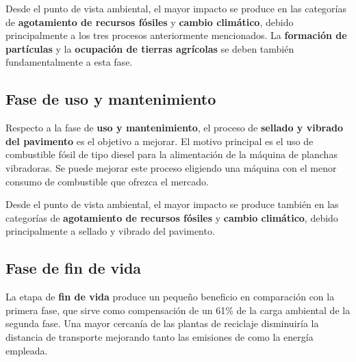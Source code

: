Desde el punto de vista ambiental, el mayor impacto se produce en las categorías de \textbf{agotamiento de recursos fósiles} y \textbf{cambio climático}, debido principalmente a los tres procesos anteriormente mencionados. La \textbf{formación de partículas} y la \textbf{ocupación de tierras agrícolas} se deben también fundamentalmente a esta fase.

\subsection{Fase de uso y mantenimiento}
Respecto a la fase de \textbf{uso y mantenimiento}, el proceso de \textbf{sellado y vibrado del pavimento} es el objetivo a mejorar. El motivo principal es el uso de combustible fósil de tipo diesel para la alimentación de la máquina de planchas vibradoras. Se puede mejorar este proceso eligiendo una máquina con el menor consumo de combustible que ofrezca el mercado.

Desde el punto de vista ambiental, el mayor impacto se produce también en las categorías de \textbf{agotamiento de recursos fósiles} y \textbf{cambio climático}, debido principalmente a sellado y vibrado del pavimento.

\subsection{Fase de fin de vida}
La etapa de \textbf{fin de vida} produce un pequeño beneficio en comparación con la primera fase, que sirve como compensación de un 61\% de la carga ambiental de la segunda fase. Una mayor cercanía de las plantas de reciclaje disminuiría la distancia de transporte mejorando tanto las emisiones de  como la energía empleada.
